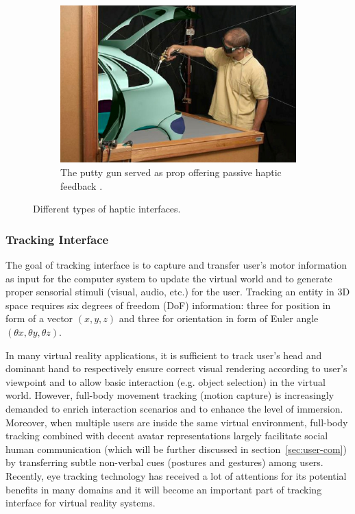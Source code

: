 \begin{figure}[htb]
  \begin{subfigure}{.32\textwidth}
    \centering
    \includegraphics[width=0.9\linewidth]{figures/ch1/prop}
    \caption{The putty gun served as prop offering passive haptic feedback \citep{Ortega2005Prop}.}
    \label{fig:1_hi:prop}
  \end{subfigure}
  \caption{\label{fig:1_hi}Different types of haptic interfaces.}
\end{figure}

\subsubsection{Tracking Interface}
\label{sec:tracking}
The goal of tracking interface is to capture and transfer user's motor information as input for the computer system to update the virtual world and to generate proper sensorial stimuli (visual, audio, etc.) for the user. Tracking an entity in 3D space requires six degrees of freedom (DoF) information: three for position in form of a vector $(x, y, z)$ and three for orientation in form of Euler angle $(\theta{x},\theta{y},\theta{z})$.

In many virtual reality applications, it is sufficient to track user's head and dominant hand to respectively ensure correct visual rendering according to user's viewpoint and to allow basic interaction (e.g. object selection) in the virtual world. However, full-body movement tracking (motion capture) is increasingly demanded to enrich interaction scenarios and to enhance the level of immersion. Moreover, when multiple users are inside the same virtual environment, full-body tracking combined with decent avatar representations largely facilitate social human communication (which will be further discussed in section~\ref{sec:user-com}) by transferring subtle non-verbal cues (postures and gestures) among users. Recently, eye tracking technology has received a lot of attentions for its potential benefits in many domains \citep{Duchowski2007Eye} and it will become an important part of tracking interface for virtual reality systems.

